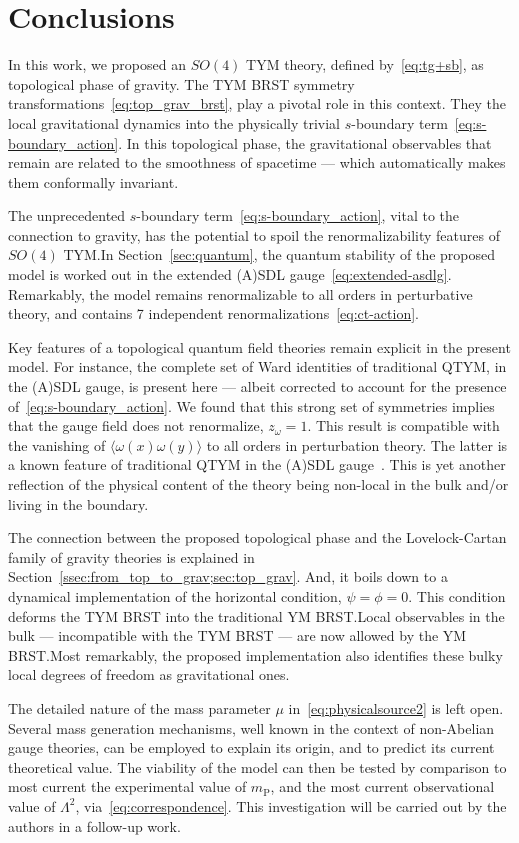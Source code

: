 \documentclass[main.tex]{subfiles}
\begin{document}
\section{Conclusions}%
\label{sec:conclusions}

In this work, we proposed an $ SO \left( 4 \right) $ TYM theory, defined by~\eqref{eq:tg+sb}, as topological phase of gravity. The TYM BRST symmetry transformations~\eqref{eq:top_grav_brst}, play a pivotal role in this context. They  the local gravitational dynamics into the physically trivial $s$-boundary term~\eqref{eq:s-boundary_action}. In this topological phase, the gravitational observables that remain are related to the smoothness of spacetime --- which automatically makes them conformally invariant.

The unprecedented $ s $-boundary term~\eqref{eq:s-boundary_action}, vital to the connection to gravity, has the potential to spoil the renormalizability features of $ SO(4) $ TYM.\@ In Section~\ref{sec:quantum}, the quantum stability of the proposed model is worked out in the extended (A){}SDL gauge~\eqref{eq:extended-asdlg}. Remarkably, the model remains renormalizable to all orders in perturbative theory, and contains 7 independent renormalizations~\eqref{eq:ct-action}.

Key features of a topological quantum field theories remain explicit in the present model. For instance, the complete set of Ward identities of traditional QTYM, in the (A){}SDL gauge, is present here --- albeit corrected to account for the presence of~\eqref{eq:s-boundary_action}. We found that this strong set of symmetries implies that the gauge field does not renormalize, $ z_{ \omega } = 1 $. This result is compatible with the vanishing of $ \langle \omega(x) \omega(y) \rangle $ to all orders in perturbation theory. The latter is a known feature of traditional QTYM in the (A){}SDL gauge~\cite{sadovski2017c,sadovski2018a}. This is yet another reflection of the physical content of the theory being non-local in the bulk and/or living in the boundary.

The connection between the proposed topological phase and the Lovelock-Cartan family of gravity theories is explained in Section~\ref{ssec:from_top_to_grav;sec:top_grav}. And, it boils down to a dynamical implementation of the horizontal condition, $ \psi = \phi = 0 $. This condition deforms the TYM BRST into the traditional YM BRST.\@ Local observables in the bulk --- incompatible with the TYM BRST --- are now allowed by the YM BRST.\@ Most remarkably, the proposed implementation also identifies these bulky local degrees of freedom as gravitational ones.

The detailed nature of the mass parameter $ \mu $ in~\eqref{eq:physicalsource2} is left open. Several mass generation mechanisms, well known in the context of non-Abelian gauge theories, can be employed to explain its origin, and to predict its current theoretical value. The viability of the model can then be tested by comparison to most current the experimental value of $ m_{ \text{P} } $, and the most current observational value of $ \Lambda^2 $, via~\eqref{eq:correspondence}. This investigation will be carried out by the authors in a follow-up work.
\end{document}
